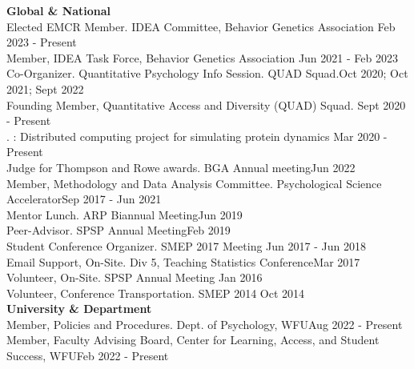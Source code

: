 {\large \textbf{Global \& National}}\smallskip\\
Elected EMCR Member. IDEA Committee, Behavior Genetics Association \hfill{Feb 2023 - Present}\smallskip\\ %
Member, IDEA Task Force, Behavior Genetics Association \hfill{Jun 2021 - Feb 2023}\smallskip\\
Co-Organizer. Quantitative Psychology Info Session. QUAD Squad.\hfill{Oct 2020; Oct 2021; Sept 2022}\smallskip\\
Founding Member, Quantitative Access and Diversity (QUAD) Squad. \hfill{Sept 2020 - Present}\smallskip\\%
. : Distributed computing project for simulating protein dynamics \hfill{Mar 2020 - Present}\smallskip\\
Judge for Thompson and Rowe awards. BGA Annual meeting\hfill{Jun 2022}\smallskip\\
Member, Methodology and Data Analysis Committee. Psychological Science Accelerator\hfill{Sep 2017 - Jun 2021}\smallskip\\
%
Mentor Lunch. ARP Biannual Meeting\hfill{Jun 2019}\smallskip\\
Peer-Advisor. SPSP Annual Meeting\hfill{Feb 2019}\smallskip\\
Student Conference Organizer. SMEP 2017 Meeting \hfill{Jun 2017 - Jun 2018}\smallskip\\
Email Support, On-Site. Div 5, Teaching Statistics Conference\hfill{Mar 2017}\smallskip\\
Volunteer, On-Site. SPSP Annual Meeting \hfill{Jan 2016}\smallskip\\
Volunteer, Conference Transportation. SMEP 2014  \hfill{Oct 2014}\smallskip\\
{\large \textbf{University \& Department}}\smallskip\\
Member, Policies and Procedures. Dept. of Psychology, WFU\hfill {Aug 2022 - Present}\smallskip\\
Member, Faculty Advising Board, Center for Learning, Access, and Student Success, WFU\hfill {Feb 2022 - Present}\smallskip\\
